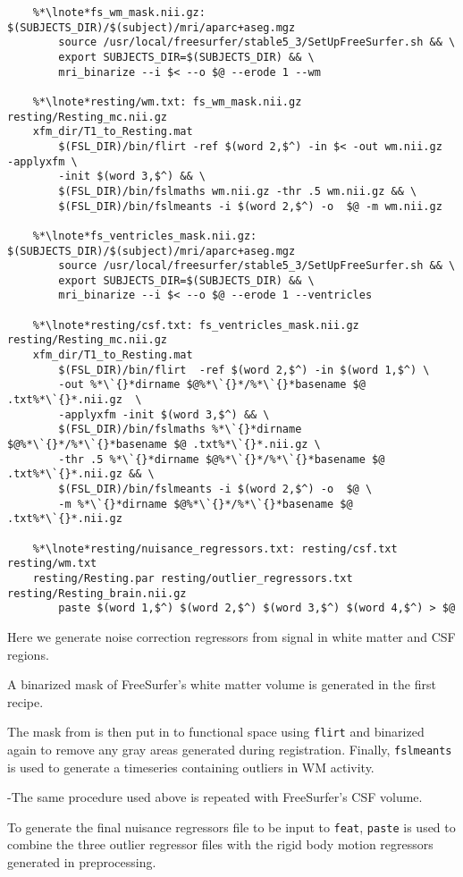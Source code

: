 \begin{lstlisting}
	%*\lnote*fs_wm_mask.nii.gz: $(SUBJECTS_DIR)/$(subject)/mri/aparc+aseg.mgz
		source /usr/local/freesurfer/stable5_3/SetUpFreeSurfer.sh && \
		export SUBJECTS_DIR=$(SUBJECTS_DIR) && \
		mri_binarize --i $< --o $@ --erode 1 --wm
	
	%*\lnote*resting/wm.txt: fs_wm_mask.nii.gz resting/Resting_mc.nii.gz 
	xfm_dir/T1_to_Resting.mat
		$(FSL_DIR)/bin/flirt -ref $(word 2,$^) -in $< -out wm.nii.gz  -applyxfm \
		-init $(word 3,$^) && \
		$(FSL_DIR)/bin/fslmaths wm.nii.gz -thr .5 wm.nii.gz && \
		$(FSL_DIR)/bin/fslmeants -i $(word 2,$^) -o  $@ -m wm.nii.gz
	
	%*\lnote*fs_ventricles_mask.nii.gz: $(SUBJECTS_DIR)/$(subject)/mri/aparc+aseg.mgz
		source /usr/local/freesurfer/stable5_3/SetUpFreeSurfer.sh && \
		export SUBJECTS_DIR=$(SUBJECTS_DIR) && \
		mri_binarize --i $< --o $@ --erode 1 --ventricles
	
	%*\lnote*resting/csf.txt: fs_ventricles_mask.nii.gz resting/Resting_mc.nii.gz 
	xfm_dir/T1_to_Resting.mat
		$(FSL_DIR)/bin/flirt  -ref $(word 2,$^) -in $(word 1,$^) \
		-out %*\`{}*dirname $@%*\`{}*/%*\`{}*basename $@ .txt%*\`{}*.nii.gz  \
		-applyxfm -init $(word 3,$^) && \
		$(FSL_DIR)/bin/fslmaths %*\`{}*dirname $@%*\`{}*/%*\`{}*basename $@ .txt%*\`{}*.nii.gz \
		-thr .5 %*\`{}*dirname $@%*\`{}*/%*\`{}*basename $@ .txt%*\`{}*.nii.gz && \
		$(FSL_DIR)/bin/fslmeants -i $(word 2,$^) -o  $@ \
		-m %*\`{}*dirname $@%*\`{}*/%*\`{}*basename $@ .txt%*\`{}*.nii.gz
	
	%*\lnote*resting/nuisance_regressors.txt: resting/csf.txt resting/wm.txt 
	resting/Resting.par resting/outlier_regressors.txt resting/Resting_brain.nii.gz
		paste $(word 1,$^) $(word 2,$^) $(word 3,$^) $(word 4,$^) > $@
\end{lstlisting}
Here we generate noise correction regressors from signal in white matter and CSF regions. 

\lnum{31}A binarized mask of FreeSurfer's white matter volume is generated in the first recipe. 

\lnum{32}The mask from \lnum{31}is then put in to functional space using \texttt{flirt} and binarized again to remove any gray areas generated during registration. Finally, \texttt{fslmeants} is used to generate a timeseries containing outliers in WM activity. 

\lnum{33}-\lnum{34}The same procedure used above is repeated with FreeSurfer's CSF volume.

\lnum{35}To generate the final nuisance regressors file to be input to \texttt{feat}, \texttt{paste} is used to combine the three outlier regressor files with the rigid body motion regressors generated in preprocessing.
\\

